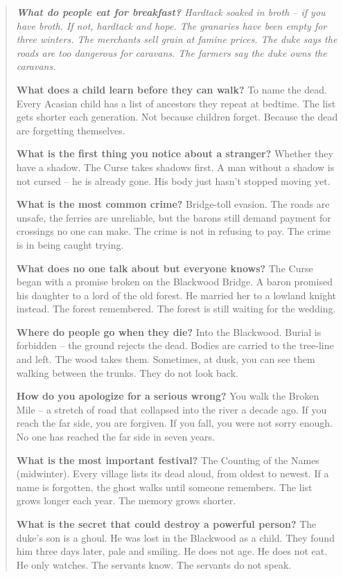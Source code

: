 \documentclass[12pt,oneside]{book}
\newenvironment{almanac}
  {\begin{quote}\small\itshape}
  {\end{quote}}
\begin{document}
\vspace{1em}
\begin{almanac}
\textbf{What do people eat for breakfast?} Hardtack soaked in broth -- if you have broth. If not, hardtack and hope. The granaries have been empty for three winters. The merchants sell grain at famine prices. The duke says the roads are too dangerous for caravans. The farmers say the duke owns the caravans.

\textbf{What does a child learn before they can walk?} To name the dead. Every Acasian child has a list of ancestors they repeat at bedtime. The list gets shorter each generation. Not because children forget. Because the dead are forgetting themselves.

\textbf{What is the first thing you notice about a stranger?} Whether they have a shadow. The Curse takes shadows first. A man without a shadow is not cursed -- he is already gone. His body just hasn't stopped moving yet.

\textbf{What is the most common crime?} Bridge-toll evasion. The roads are unsafe, the ferries are unreliable, but the barons still demand payment for crossings no one can make. The crime is not in refusing to pay. The crime is in being caught trying.

\textbf{What does no one talk about but everyone knows?} The Curse began with a promise broken on the Blackwood Bridge. A baron promised his daughter to a lord of the old forest. He married her to a lowland knight instead. The forest remembered. The forest is still waiting for the wedding.

\textbf{Where do people go when they die?} Into the Blackwood. Burial is forbidden -- the ground rejects the dead. Bodies are carried to the tree-line and left. The wood takes them. Sometimes, at dusk, you can see them walking between the trunks. They do not look back.

\textbf{How do you apologize for a serious wrong?} You walk the Broken Mile -- a stretch of road that collapsed into the river a decade ago. If you reach the far side, you are forgiven. If you fall, you were not sorry enough. No one has reached the far side in seven years.

\textbf{What is the most important festival?} The Counting of the Names (midwinter). Every village lists its dead aloud, from oldest to newest. If a name is forgotten, the ghost walks until someone remembers. The list grows longer each year. The memory grows shorter.

\textbf{What is the secret that could destroy a powerful person?} The duke's son is a ghoul. He was lost in the Blackwood as a child. They found him three days later, pale and smiling. He does not age. He does not eat. He only watches. The servants know. The servants do not speak.
\end{almanac}
\end{document}
